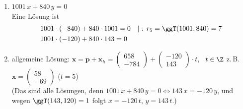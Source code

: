 \begin{loesung}
\begin{enumerate}
\item[(ii)] $1001\,x + 840\,y = 0$\\
Eine Lösung ist
\begin{align*}
&1001\cdot(-840) + 840\cdot 1001 = 0 \quad |:\, r_5 = \ggT(1001, 840) = 7\\
&1001\cdot(-120) + 840\cdot 143 = 0
\end{align*}
\item[(iii)] allgemeine Lösung: $\mathbf{x} = \mathbf{p} + \mathbf{x}_h = \begin{pmatrix}658\\-784\end{pmatrix} + \begin{pmatrix}-120\\143\end{pmatrix} \cdot t$, \ $t \in \Z$ \quad z.\,B. $\mathbf{x} = \begin{pmatrix}58\\-69\end{pmatrix}$ ($t = 5$)\\
(Das sind alle Lösungen, denn $1001\,x + 840\,y = 0 \Leftrightarrow 143\,x = -120\,y$, und wegen $\ggT(143, 120) = 1$ folgt $x = -120\,t$, $y = 143\,t$.)
\end{enumerate}
\end{loesung}
